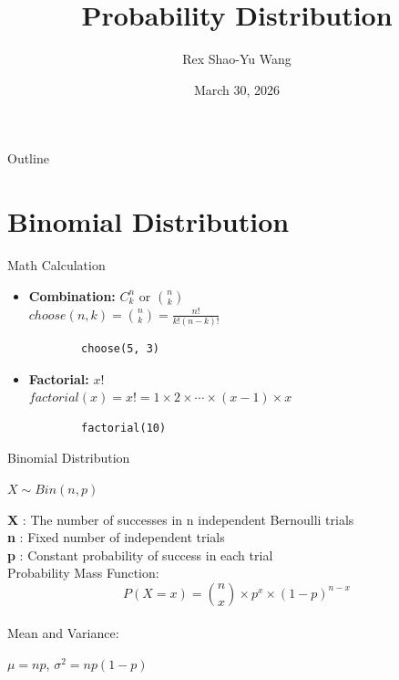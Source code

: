 \documentclass{beamer}
\title{Probability Distribution}
\author{Rex Shao-Yu Wang}
\institute{Department of Agronomy, National Taiwan University}
\date{March 30, 2026}
\begin{document}
\begin{frame}
  \titlepage
\end{frame}

\begin{frame}{Outline}
  \tableofcontents
\end{frame}

\section{Binomial Distribution}
\begin{frame}[fragile]{Math Calculation}
\begin{itemize}
    \item \textbf{Combination:} $C^{n}_{k}$ or $\binom{n}{k}$\\
    \vspace{5pt}
    $choose(n, k) = \binom{n}{k} = \frac{n!}{k! (n-k)!}$
    \vspace{5pt}
    \begin{lstlisting}
        choose(5, 3)
    \end{lstlisting}
    \vspace{10pt}
    \item \textbf{Factorial:} $x!$\\
    \vspace{5pt}
    $factorial(x) = x! = 1\times2\times\cdots\times(x-1)\times x$
    \vspace{5pt}
    \begin{lstlisting}
        factorial(10)
    \end{lstlisting}
\end{itemize}

    
\end{frame}
\begin{frame}{Binomial Distribution}
\begin{center}
    {\LARGE $X \sim Bin(n, p) $}
\end{center}
\textbf{X} : The number of successes in n independent Bernoulli trials \\
\textbf{n} : Fixed number of independent trials \\
\textbf{p} : Constant probability of success in each trial\\
\vspace{10pt}
Probability Mass Function: 
\begin{equation}
P(X = x) = \binom{n}{x} \times p^x\times (1-p)^{n-x}
\end{equation}\\
Mean and Variance:
\begin{center}
$\mu = np$, $\sigma^2 = np(1-p)$
\end{center}
\end{frame}
\end{document}
